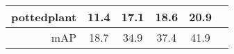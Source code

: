 \begin{tabular}{@{}rccccl@{}}
pottedplant   & 11.4                       & 17.1                        & 18.6                       & 20.9 \\
\midrule
mAP           & 18.7                       & 34.9                        & 37.4                       & 41.9 \\
\bottomrule
\end{tabular}
